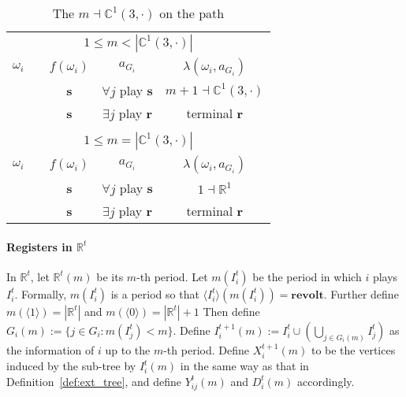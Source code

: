 \documentclass[12pt,letter]{article}
\newcommand{\Kappa}{\mathbb{C}}
\newcommand{\Omicron}{\mathbb{R}}
\theoremstyle{definition}
\theoremstyle{remark}
\theoremstyle{claim}
\begin{document}
\begin{table}[!htbp]
\caption{The $m\dashv\Kappa^1(3,\cdot)$ on the path}
\label{table:eqm_path_k03}
\begin{center}
\begin{tabular}{c c | c | c | c}
\multicolumn{5}{c}{$1\leq m < |\Kappa^1(3,\cdot)|$}\\
$\omega_i$ 	 & 	   &	$f(\omega_i)$  &	$a_{G_i}$ & $\lambda(\omega_i,a_{G_i})$ \\
\hline
\hline
  	&	& \textbf{s} & $\forall j$ play $\textbf{s}$ 	& $m+1\dashv \Kappa^1(3,\cdot)$\\
  	&  & \textbf{s}  &  $\exists j$ play $\textbf{r}$  	& terminal \textbf{r}\\
\hline
\\
\multicolumn{5}{c}{$1\leq m = |\Kappa^1(3,\cdot)|$}\\
$\omega_i$ 	 & 	   &	$f(\omega_i)$  &	$a_{G_i}$ & $\lambda(\omega_i,a_{G_i})$ \\
\hline
\hline
  	& 	& \textbf{s} & $\forall j$ play $\textbf{s}$ 	& $1\dashv \Omicron^1$\\
  	&  & \textbf{s}  &  $\exists j$ play $\textbf{r}$  	& terminal \textbf{r}\\
\hline
\end{tabular}
\end{center}
\end{table}



\clearpage

\paragraph{Registers in $\Omicron^t$}
In $\Omicron^t$, let $\Omicron^t(m)$ be its $m$-th period. Let $m(I^{t}_i)$ be the period in which $i$ plays $I^t_i$. Formally, $m(I^t_i)$ is a period so that $\langle I^{t}_i \rangle(m(I^t_i))=\textbf{revolt}$. Further define $m(\langle 1 \rangle)=|\Omicron^t|$ and $m(\langle 0 \rangle)=|\Omicron^t|+1$ Then define $G_i(m):=\{j\in G_i: m(I^t_j)<m\}$. Define $I^{t+1}_i(m):= I^t_i\cup(\bigcup_{j\in G_i(m)}I^t_j)$ as the information of $i$ up to the $m$-th period. Define $X^{t+1}_i(m)$ to be the vertices induced by the sub-tree by $I^t_i(m)$ in the same way as that in Definition~\ref{def:ext_tree}, and define $Y^t_{ij}(m)$ and $D^t_i(m)$ accordingly.



\end{document}
